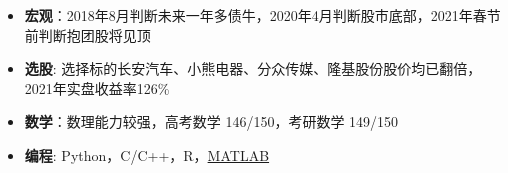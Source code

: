   \begin{itemize}[leftmargin=*]
    \item \textbf{宏观}：2018年8月判断未来一年多债牛，2020年4月判断股市底部，2021年春节前判断抱团股将见顶
    \item \textbf{选股}: 选择标的长安汽车、小熊电器、分众传媒、隆基股份股价均已翻倍，2021年实盘收益率126\%
    \item \textbf{数学}：数理能力较强，高考数学 146/150，考研数学 149/150
    \item \textbf{编程}: Python，C/C++，R，\href{https://www.mathworks.com/}{MATLAB}
  \end{itemize}